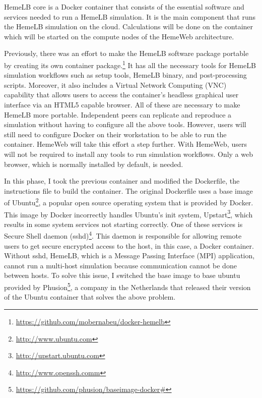 HemeLB core is a Docker container that consists of the essential software and services needed to run a HemeLB simulation. It is the main component that runs the HemeLB simulation on the cloud. Calculations will be done on the container which will be started on the compute nodes of the HemeWeb architecture. 

Previously, there was an effort to make the HemeLB software package portable by creating its own container package.\footnote{\url{https://github.com/mobernabeu/docker-hemelb}} It has all the necessary tools for HemeLB simulation workflows such as setup tools, HemeLB binary, and post-processing scripts. Moreover, it also includes a Virtual Network Computing (VNC) capability that allows users to access the container's headless graphical user interface via an HTML5 capable browser. All of these are necessary to make HemeLB more portable. Independent peers can replicate and reproduce a simulation without having to configure all the above tools. However, users will still need to configure Docker on their workstation to be able to run the container. HemeWeb will take this effort a step further. With HemeWeb, users will not be required to install any tools to run simulation workflows. Only a web browser, which is normally installed by default, is needed.


In this phase, I took the previous container and modified the Dockerfile, the instructions file to build the container. The original Dockerfile uses a base image of Ubuntu\footnote{\url{http://www.ubuntu.com}}, a popular open source operating system that is provided by Docker. This image by Docker incorrectly handles Ubuntu's init system, Upstart\footnote{\url{http://upstart.ubuntu.com}}, which results in some system services not starting correctly. One of these services is Secure Shell daemon (sshd)\footnote{\url{http://www.openssh.comm}}. This daemon is responsible for allowing remote users to get secure encrypted access to the host, in this case, a Docker container. Without sshd, HemeLB, which is a Message Passing Interface (MPI) application, cannot run a multi-host simulation because communication cannot be done between hosts.  To solve this issue, I switched the base image to base ubuntu provided by Phusion\footnote{\url{https://github.com/phusion/baseimage-docker#}}, a company in the Netherlands that released their version of the Ubuntu container that solves the above problem.

